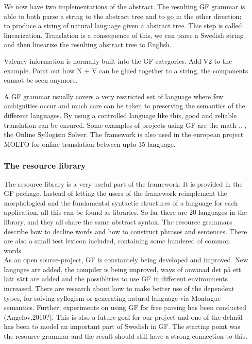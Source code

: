 \documentclass{report}
\begin{document}

We now have two implementations of the abstract. The resulting GF grammar is able to
both parse a string to the abstract tree and to go in the other direction; to produce
a string of natural language given a abstract tree. This step is called linearization.
Translation is a consequence of this, we can parse a Swedish string and then 
linearize the resulting abstract tree to English. 

Valency information is normally built into the GF categories. Add V2 to the example.
Point out how N + V can be glued together to a string, the components cannot be seen
anymore.

A GF grammar usually covers a very restricted set of language where few ambiguities
occur and much care can be taken to preserving the semantics of the
different languages.
By using a controlled language like this,  good and reliable translation can be
ensured. Some examples of projects using GF are the math .. \cite{olga}, the
Online Syllogism Solver\cite{malin!}.  The framework is also used in the
european project MOLTO for online translation between upto 15 language.\\

\subsubsection{The resource library}
The resource library\cite{gf-resource} is a very useful part of the framework. It is provided in the 
GF package. %
Instead of letting the users of the framework reimplement the morphological and
the fundamental syntactic structures of a language for each application, all
this can be found as libraries. So far there are 20 languages in the library, and
they all share the same abstract syntax.
The resource grammars describe how to decline words and how to construct
phrases and sentences.
There are also a small test lexicon included, containing some hundered of common words.\\

As an open source-project, GF is constantely being developed and improved. New
languges are added, the compiler is being improved, ways of använad det på ett
lätt sätt are added and the possiblities to use GF in different environments
increased. There are  research about how to make better use of the dependent
types, for solving syllogism or generating natural language via Montague
semantics.
Further, experiments on using GF for free parsing has been conducted (Angelov,2010?).
This is also a future goal for our project and one of the delmål has been to
model an important part of Swedish in GF. The starting point was the resource
grammar and the result should still have a strong connection to this.
\end{document}
